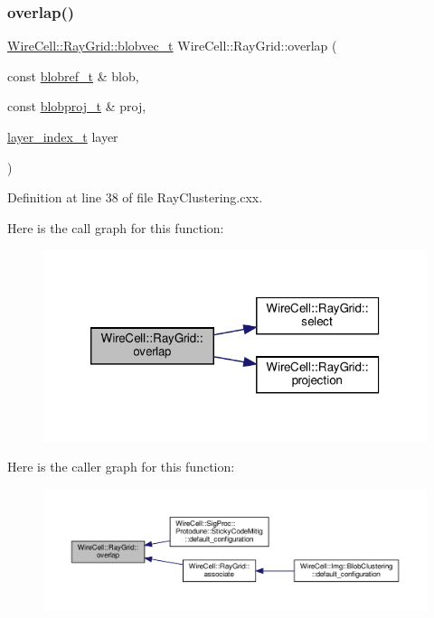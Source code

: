 \subsubsection{\texorpdfstring{overlap()}{overlap()}}
{\footnotesize\ttfamily \hyperlink{namespace_wire_cell_1_1_ray_grid_a3154c64db4d07056418dfcd1afbf0531}{Wire\+Cell\+::\+Ray\+Grid\+::blobvec\+\_\+t} Wire\+Cell\+::\+Ray\+Grid\+::overlap (\begin{DoxyParamCaption}\item[{const \hyperlink{namespace_wire_cell_1_1_ray_grid_abed76699c704f53d6c4ce912da18050b}{blobref\+\_\+t} \&}]{blob,  }\item[{const \hyperlink{namespace_wire_cell_1_1_ray_grid_a2495e73e12fdf4e81ffef9d99f8a8e22}{blobproj\+\_\+t} \&}]{proj,  }\item[{\hyperlink{namespace_wire_cell_1_1_ray_grid_ab7562e54b58eede813d5b70b5eb85812}{layer\+\_\+index\+\_\+t}}]{layer }\end{DoxyParamCaption})}



Definition at line 38 of file Ray\+Clustering.\+cxx.

Here is the call graph for this function\+:
\nopagebreak
\begin{figure}[H]
\begin{center}
\leavevmode
\includegraphics[width=320pt]{namespace_wire_cell_1_1_ray_grid_af03e98b7efe2bb929cf7d581897eff83_cgraph}
\end{center}
\end{figure}
Here is the caller graph for this function\+:
\nopagebreak
\begin{figure}[H]
\begin{center}
\leavevmode
\includegraphics[width=350pt]{namespace_wire_cell_1_1_ray_grid_af03e98b7efe2bb929cf7d581897eff83_icgraph}
\end{center}
\end{figure}
\mbox{\label{namespace_wire_cell_1_1_ray_grid_ab1dc12b3013c5cc290ca5f8d945d54e5}} 
